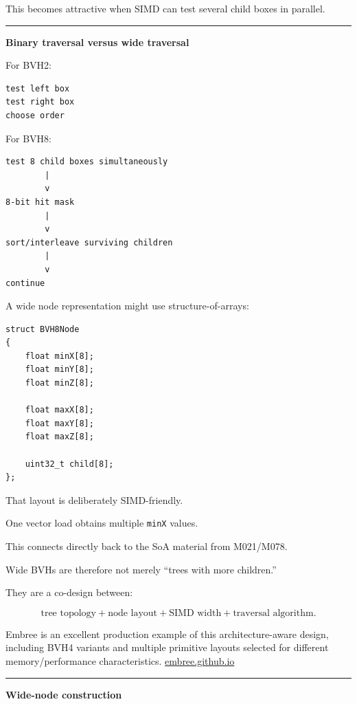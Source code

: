 This becomes attractive when SIMD can test several child boxes in parallel.

\begin{center}\rule{0.5\linewidth}{0.5pt}\end{center}

\textbf{Binary traversal versus wide traversal}

For BVH2:

\begin{verbatim}
test left box
test right box
choose order
\end{verbatim}

For BVH8:

\begin{verbatim}
test 8 child boxes simultaneously
        |
        v
8-bit hit mask
        |
        v
sort/interleave surviving children
        |
        v
continue
\end{verbatim}

A wide node representation might use structure-of-arrays:

\begin{verbatim}
struct BVH8Node
{
    float minX[8];
    float minY[8];
    float minZ[8];

    float maxX[8];
    float maxY[8];
    float maxZ[8];

    uint32_t child[8];
};
\end{verbatim}

That layout is deliberately SIMD-friendly.

One vector load obtains multiple \texttt{minX} values.

This connects directly back to the SoA material from M021/M078.

Wide BVHs are therefore not merely ``trees with more children.''

They are a co-design between:

\[
\boxed{
\text{tree topology}
+
\text{node layout}
+
\text{SIMD width}
+
\text{traversal algorithm}.
}
\]

Embree is an excellent production example of this architecture-aware design, including BVH4 variants and multiple primitive layouts selected for different memory/performance characteristics. \href{https://embree.github.io/papers/2014-Siggraph-Embree.pdf?utm_source=chatgpt.com}{embree.github.io}

\begin{center}\rule{0.5\linewidth}{0.5pt}\end{center}

\textbf{Wide-node construction}


